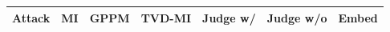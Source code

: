 \begin{center}
\begin{tabular}{lcccccc}
\toprule
\textbf{Attack} & \textbf{MI} & \textbf{GPPM} & \textbf{TVD-MI} & \textbf{Judge w/} & \textbf{Judge w/o} & \textbf{Embed} \\
\midrule
\bottomrule
\end{tabular}
\end{center}